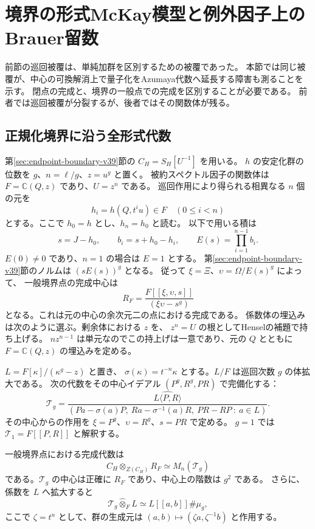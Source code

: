\section{境界の形式McKay模型と例外因子上のBrauer留数}
\label{sec:boundary-ramification-v40}

前節の巡回被覆は、単純加群を区別するための被覆であった。
本節では同じ被覆が、中心の可換解消上で量子化をAzumaya代数へ延長する障害も測ることを示す。
閉点の完成と、境界の一般点での完成を区別することが必要である。
前者では巡回被覆が分裂するが、後者ではその関数体が残る。

\subsection{正規化境界に沿う全形式代数}

第\ref{sec:endpoint-boundary-v39}節の $C_H=S_H[U^{-1}]$ を用いる。
$h$ の安定化群の位数を $g$、$n=\ell/g$、$z=u^g$ と置く。
被約スペクトル因子の関数体は $F=\mathbb C(Q,z)$ であり、$U=z^n$ である。
巡回作用により得られる相異なる $n$ 個の元を
\[
 h_i=h(Q,t^i u)\in F\quad(0\le i<n)
\]
とする。ここで $h_0=h$ とし、$h_n=h_0$ と読む。
以下で用いる積は
\[
 s=J-h_0,\qquad b_i=s+h_0-h_i,\qquad
 E(s)=\prod_{i=1}^{n-1}b_i.
\]
$E(0)\ne0$ であり、$n=1$ の場合は $E=1$ とする。
第\ref{sec:endpoint-boundary-v39}節のノルムは $(sE(s))^g$ となる。
従って $\xi=\Xi$、$\upsilon=\Omega/E(s)^g$ によって、
一般境界点の完成中心は
\begin{equation}\label{eq:boundary-transverse-center-v40}
 R_F=\frac{F[[\xi,\upsilon,s]]}{(\xi\upsilon-s^g)}
\end{equation}
となる。これは元の中心の余次元二の点における完成である。
係数体の埋込みは次のように選ぶ。剰余体における $z$ を、
$z^n=U$ の根としてHenselの補題で持ち上げる。
$nz^{n-1}$ は単元なのでこの持上げは一意であり、元の $Q$ とともに
$F=\mathbb C(Q,z)$ の埋込みを定める。

$L=F[\kappa]/(\kappa^g-z)$ と置き、
$\sigma(\kappa)=t^{-n}\kappa$ とする。$L/F$ は巡回次数 $g$ の体拡大である。
次の代数をその中心イデアル $(P^g,R^g,PR)$ で完備化する：
\begin{equation}\label{eq:boundary-formal-corner-v40}
 \mathcal T_g=
 \widehat{\frac{L\langle P,R\rangle}
 {(Pa-\sigma(a)P,\ Ra-\sigma^{-1}(a)R,\ PR-RP\ :\ a\in L)}}.
\end{equation}
その中心からの作用を $\xi=P^g$、$\upsilon=R^g$、$s=PR$ で定める。
$g=1$ では $\mathcal T_1=F[[P,R]]$ と解釈する。

\begin{theorem}[巡回降下の全形式延長]
\label{thm:boundary-formal-descent-v40}
一般境界点における完成代数は
\begin{equation}\label{eq:boundary-formal-matrix-v40}
 C_H\otimes_{Z(C_H)}R_F\simeq M_n(\mathcal T_g)
\end{equation}
である。$\mathcal T_g$ の中心は正確に $R_F$ であり、中心上の階数は $g^2$ である。
さらに、係数を $L$ へ拡大すると
\[
 \mathcal T_g\widehat\otimes_F L
 \simeq L[[a,b]]\#\mu_g,
\]
ここで $\zeta=t^n$ として、群の生成元は $(a,b)\mapsto(\zeta a,\zeta^{-1}b)$ と作用する。
\end{theorem}

